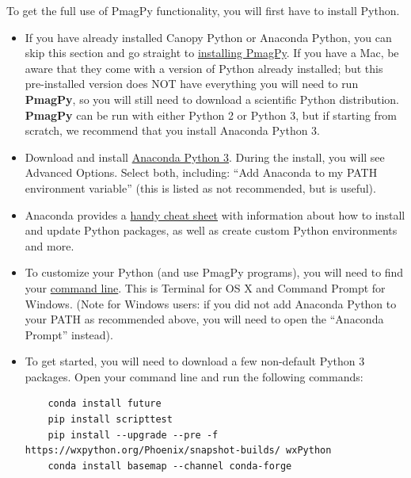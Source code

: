 \documentclass[11pt]{book}
\begin{document}
{\begin{itemize}
To get the full  use of PmagPy functionality, you will first have to install Python.


   \begin{itemize}
   \item If you have already installed Canopy Python or Anaconda Python, you can skip this section and go straight to \href{#pip_install}{installing PmagPy}.  If you have a Mac, be aware that they come with a version of Python already installed; but this pre-installed version does NOT have everything you will need to run {\bf PmagPy}, so you will still need to download a scientific Python distribution.  {\bf PmagPy} can be run with either Python 2 or Python 3, but if starting from scratch, we recommend that you install Anaconda Python 3.
   \item Download and install \href{https://www.continuum.io/downloads}{Anaconda Python 3}.  During the install, you will see Advanced Options.  Select both, including: ``Add Anaconda to my PATH environment variable''  (this is listed as not recommended, but is useful).
   \item Anaconda provides a \href{https://conda.io/docs/_downloads/conda-cheatsheet.pdf}{handy cheat sheet} with information about how to install and update Python packages, as well as create custom Python environments and more.
   \item To customize your Python (and use PmagPy programs), you will need to find your \href{#command_line}{command line}.  This is Terminal for OS X and Command Prompt for Windows.  (Note for Windows users: if you did not add Anaconda Python to your PATH as recommended above, you will need to open the ``Anaconda Prompt'' instead).

   \item To get started, you will need to download a few non-default Python 3 packages.  Open your command line and run the following commands: \begin{verbatim}
    conda install future
    pip install scripttest
    pip install --upgrade --pre -f https://wxpython.org/Phoenix/snapshot-builds/ wxPython
    conda install basemap --channel conda-forge
\end{verbatim}


\end{itemize}
\end{itemize}}
\end{document}
